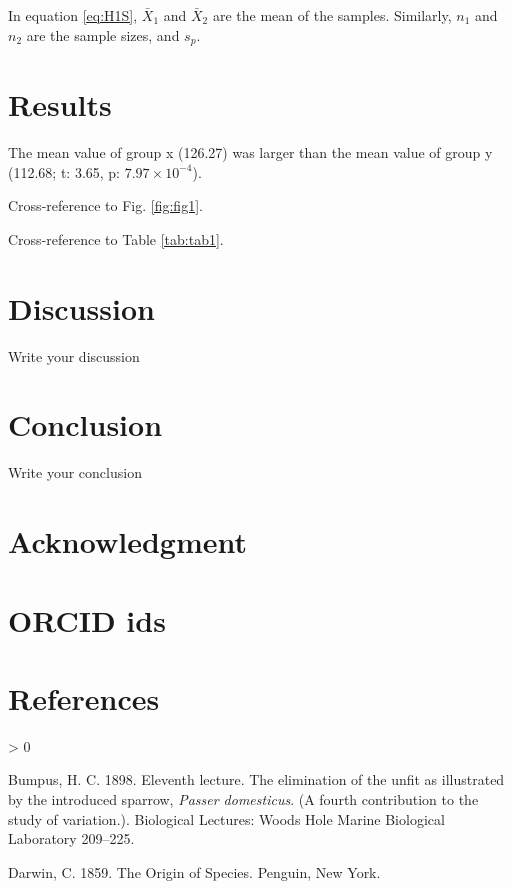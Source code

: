 \documentclass[
  12pt,
]{article}
\newlength{\cslhangindent}
\newenvironment{CSLReferences}[2] %
 {%
  \setlength{\parindent}{0pt}
  \ifodd #1 \everypar{\setlength{\hangindent}{\cslhangindent}}\ignorespaces\fi
  \ifnum #2 > 0
  \setlength{\parskip}{#2\baselineskip}
  \fi
 }%
 {}
\begin{document}
In equation \eqref{eq:H1S}, \(\bar{X}_{1}\) and \(\bar{X}_{2}\) are the mean of the samples. Similarly, \(n_{1}\) and \(n_{2}\) are the sample sizes, and \(s_{p}\).

\hypertarget{results}{%
\section{Results}\label{results}}

The mean value of group x (126.27) was larger than the mean value of group y (112.68; t: 3.65, p: \ensuremath{7.97\times 10^{-4}}).

Cross-reference to Fig. \ref{fig:fig1}.

Cross-reference to Table \ref{tab:tab1}.

\hypertarget{discussion}{%
\section{Discussion}\label{discussion}}

Write your discussion

\hypertarget{conclusion}{%
\section{Conclusion}\label{conclusion}}

Write your conclusion

\pagebreak

\hypertarget{acknowledgment}{%
\section*{Acknowledgment}\label{acknowledgment}}

\hypertarget{orcid-ids}{%
\section*{ORCID ids}\label{orcid-ids}}

\pagebreak

\hypertarget{references}{%
\section*{References}\label{references}}

\hypertarget{refs}{}
\begin{CSLReferences}{1}{0}
\leavevmode\hypertarget{ref-Bumpus1898}{}%
Bumpus, H. C. 1898. {Eleventh lecture. The elimination of the unfit as illustrated by the introduced sparrow, {\emph{Passer domesticus}}. (A fourth contribution to the study of variation.)}. Biological Lectures: Woods Hole Marine Biological Laboratory 209--225.

\leavevmode\hypertarget{ref-Darwin1859}{}%
Darwin, C. 1859. {The Origin of Species}. Penguin, New York.

\end{CSLReferences}
\end{document}
